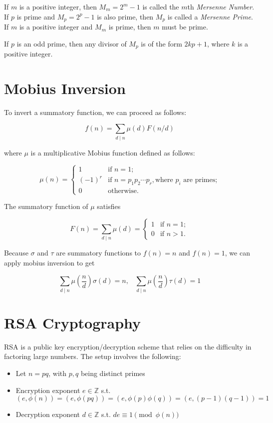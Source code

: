 \documentclass{article}
\begin{document}
\begin{multicols*}{2}
If $m$ is a positive integer, then $M_m = 2^m - 1$ is called the $m$th \textit{Mersenne Number}. If $p$ is prime and $M_p = 2^p - 1$ is also prime, then $M_p$ is called a \textit{Mersenne Prime}. If $m$ is a positive integer and $M_m$ is prime, then $m$ must be prime.

If $p$ is an odd prime, then any divisor of $M_p$ is of the form $2kp+1$, where $k$ is a positive integer.

\section{Mobius Inversion}

To invert a summatory function, we can proceed as follows:

\[f(n) = \sum_{d \mid n} \mu(d)F(n/d)\]

where $\mu$ is a multiplicative Mobius function defined as follows:

\[
\mu(n) = \begin{cases}
1 & \text{if } n=1; \\
(-1)^r & \text{if } n = p_1p_2\cdots p_r, \text{where } p_i \text{ are primes;}\\
0 & \text{otherwise.}
\end{cases}
\]

The summatory function of $\mu$ satisfies

\[F(n) = \sum_{d\mid n} \mu(d) = \begin{cases}
1 & \text{if } n = 1; \\
0 & \text{if } n > 1.
\end{cases}
\]

Because $\sigma$ and $\tau$ are summatory functions to $f(n)=n$ and $f(n) = 1$, we can apply mobius inversion to get

\[\sum_{d \mid n} \mu\left(\frac{n}{d}\right)\sigma(d) = n,\;\;\; \sum_{d \mid n} \mu\left(\frac{n}{d}\right)\tau(d) = 1\]

\section{RSA Cryptography}

RSA is a public key encryption/decryption scheme that relies on the difficulty in factoring large numbers. The setup involves the following:

\begin{itemize}
\item Let $n = pq$, with $p, q$ being distinct primes
\item Encryption exponent $e \in \mathbb{Z}$ s.t. $(e, \phi(n)) =(e, \phi(pq)) = (e, \phi(p)\phi(q)) = (e, (p-1)(q-1))= 1$
\item Decryption exponent $d \in \mathbb{Z}$ s.t. $de \equiv 1 \pmod{\phi(n)}$
\end{itemize}


\end{multicols*}
\end{document}
